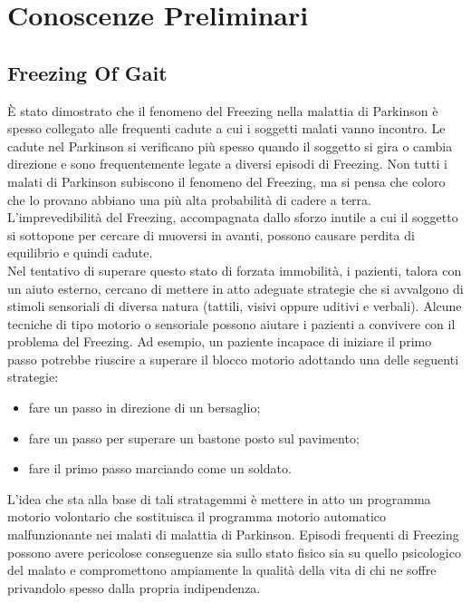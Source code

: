 

\chapter{Conoscenze Preliminari}\label{chap3:background}
\section{Freezing Of Gait}
È stato dimostrato che il fenomeno del Freezing nella malattia di Parkinson è spesso collegato alle frequenti cadute a cui i soggetti malati vanno incontro. Le cadute nel Parkinson si verificano più spesso quando il soggetto si gira o cambia direzione e sono frequentemente legate a diversi episodi di Freezing. Non tutti i malati di Parkinson subiscono il fenomeno del Freezing, ma si pensa che coloro che lo provano abbiano una più alta probabilità di cadere a terra. L’imprevedibilità del Freezing, accompagnata dallo sforzo inutile a cui il soggetto si sottopone per cercare di muoversi in avanti, possono causare perdita di equilibrio e quindi cadute. \\
Nel tentativo di superare questo stato di forzata immobilità, i pazienti, talora con un aiuto esterno, cercano di mettere in atto adeguate strategie che si avvalgono di stimoli sensoriali di diversa natura (tattili, visivi oppure uditivi e verbali). Alcune tecniche di tipo motorio o sensoriale possono aiutare i pazienti a convivere con il problema del Freezing. Ad esempio, un paziente incapace di iniziare il primo passo potrebbe riuscire a superare il blocco motorio adottando una delle seguenti strategie:
\begin{itemize}
	\item fare un passo in direzione di un bersaglio;
	\item fare un passo per superare un bastone posto sul pavimento;
	\item fare il primo passo marciando come un soldato.
\end{itemize}
L’idea che sta alla base di tali stratagemmi è mettere in atto un programma motorio volontario che sostituisca il programma motorio automatico malfunzionante nei malati di malattia di Parkinson. Episodi frequenti di Freezing possono avere pericolose conseguenze sia sullo stato fisico sia su quello psicologico del malato e compromettono ampiamente la qualità della vita di chi ne soffre privandolo spesso dalla propria indipendenza.\\
